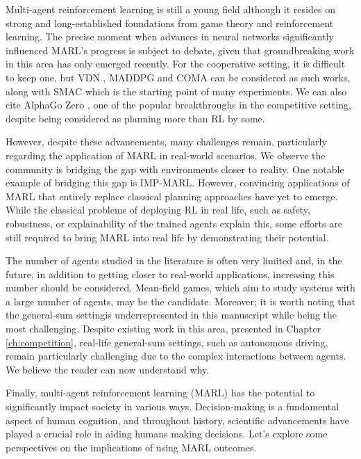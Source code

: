 Multi-agent reinforcement learning is still a young field although it resides on strong and long-established foundations from game theory and reinforcement learning.
The precise moment when advances in neural networks significantly influenced MARL's progress is subject to debate, given that groundbreaking work in this area has only emerged recently.
For the cooperative setting, it is difficult to keep one, but VDN \citep{sunehag2018vdn}, MADDPG \cite{lowe2017multi} and COMA \citep{foerster2017coma} can be considered as such works, along with SMAC \citep{samvelyan2019starcraft} which is the starting point of many experiments.
We can also cite AlphaGo Zero \citep{silver2017mastering}, one of the popular breakthroughs in the competitive setting, despite being considered as planning more than RL by some.

However, despite these advancements, many challenges remain, particularly regarding the application of MARL in real-world scenarios.
We observe the community is bridging the gap with environments closer to reality.
One notable example of bridging this gap is IMP-MARL.
However, convincing applications of MARL that entirely replace classical planning approaches have yet to emerge.
While the classical problems of deploying RL in real life, such as safety, robustness, or explainability of the trained agents explain this, some efforts are still required to bring MARL into real life by demonstrating their potential.

The number of agents studied in the literature is often very limited and, in the future, in addition to getting closer to real-world applications, increasing this number should be considered.
Mean-field games, which aim to study systems with a large number of agents, may be the candidate.
Moreover, it is worth noting that the general-sum settingis underrepresented in this manuscript while being the most challenging.
Despite existing work in this area, presented in Chapter \ref{ch:competition}, real-life general-sum settings, such as autonomous driving, remain particularly challenging due to the complex interactions between agents.
We believe the reader can now understand why.

Finally, multi-agent reinforcement learning (MARL) has the potential to significantly impact society in various ways.
Decision-making is a fundamental aspect of human cognition, and throughout history, scientific advancements have played a crucial role in aiding humans making decisions.
Let's explore some perspectives on the implications of using MARL outcomes.

